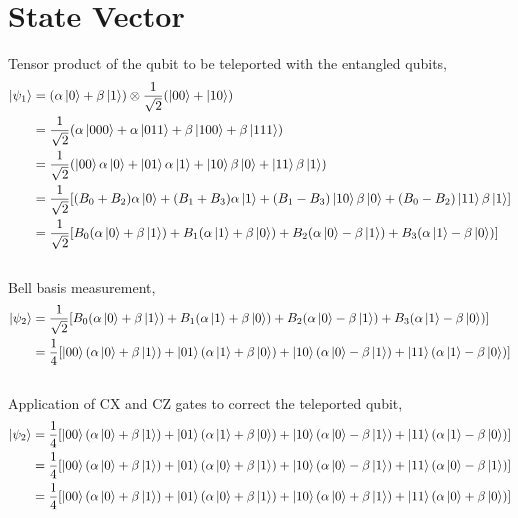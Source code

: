 \documentclass[12pt]{article}
\begin{document}
  \section{State Vector}
  Tensor product of the qubit to be teleported with the entangled qubits,\\
  \begin{equation*}
      \begin{split}
      \ket{\psi_1} & = (\alpha \ket{0} + \beta \ket{1}) \otimes \frac{1}{\sqrt{2}}(\ket{00} + \ket{10})\\
      & =\frac{1}{\sqrt{2}}(\alpha\ket{000} + \alpha\ket{011} + \beta\ket{100} + \beta\ket{111})\\
      & =\frac{1}{\sqrt{2}}(\ket{00}\alpha\ket{0} + \ket{01}\alpha\ket{1} + \ket{10}\beta\ket{0} + \ket{11}\beta\ket{1})\\
      & =\frac{1}{\sqrt{2}}[
        (B_0+B_2)\alpha\ket{0} +
        (B_1+B_3)\alpha\ket{1} +
        (B_1-B_3)\ket{10}\beta\ket{0} +
        (B_0-B_2)\ket{11}\beta\ket{1}]\\
      & = \frac{1}{\sqrt{2}}[
      B_0(\alpha\ket{0} + \beta\ket{1}) +
      B_1(\alpha\ket{1} + \beta\ket{0}) +
      B_2(\alpha\ket{0} - \beta\ket{1}) +
      B_3(\alpha\ket{1} - \beta\ket{0})]
    \end{split}
  \end{equation*}\\
  Bell basis measurement,\\
  \begin{equation*}
    \begin{split}
      \ket{\psi_2} & = \frac{1}{\sqrt{2}}[
      B_0(\alpha\ket{0} + \beta\ket{1}) +
      B_1(\alpha\ket{1} + \beta\ket{0}) +
      B_2(\alpha\ket{0} - \beta\ket{1}) +
      B_3(\alpha\ket{1} - \beta\ket{0})]\\
      & = \frac{1}{4}[
      \ket{00}(\alpha\ket{0} + \beta\ket{1}) +
      \ket{01}(\alpha\ket{1} + \beta\ket{0}) +
      \ket{10}(\alpha\ket{0} - \beta\ket{1}) +
      \ket{11}(\alpha\ket{1} - \beta\ket{0})]
    \end{split}
  \end{equation*}\\ 
  Application of CX and CZ gates to correct the teleported qubit,\\ 
  \begin{equation*}
    \begin{split}
      \ket{\psi_2} & = \frac{1}{4}[
      \ket{00}(\alpha\ket{0} + \beta\ket{1}) +
      \ket{01}(\alpha\ket{1} + \beta\ket{0}) +
      \ket{10}(\alpha\ket{0} - \beta\ket{1}) +
      \ket{11}(\alpha\ket{1} - \beta\ket{0})]\\
      & = \frac{1}{4}[
      \ket{00}(\alpha\ket{0} + \beta\ket{1}) +
      \ket{01}(\alpha\ket{0} + \beta\ket{1}) +
      \ket{10}(\alpha\ket{0} - \beta\ket{1}) +
      \ket{11}(\alpha\ket{0} - \beta\ket{1})]\\
      & = \frac{1}{4}[
      \ket{00}(\alpha\ket{0} + \beta\ket{1}) +
      \ket{01}(\alpha\ket{0} + \beta\ket{1}) +
      \ket{10}(\alpha\ket{0} + \beta\ket{1}) +
      \ket{11}(\alpha\ket{0} + \beta\ket{0})]
    \end{split}
  \end{equation*}\\
\end{document}

